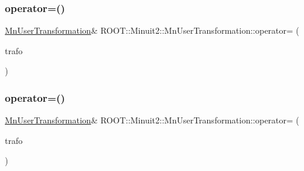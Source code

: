 \subsubsection{\texorpdfstring{operator=()}{operator=()}\hspace{0.1cm}{\footnotesize\ttfamily [1/3]}}
{\footnotesize\ttfamily \mbox{\hyperlink{classROOT_1_1Minuit2_1_1MnUserTransformation}{Mn\+User\+Transformation}}\& R\+O\+O\+T\+::\+Minuit2\+::\+Mn\+User\+Transformation\+::operator= (\begin{DoxyParamCaption}\item[{const \mbox{\hyperlink{classROOT_1_1Minuit2_1_1MnUserTransformation}{Mn\+User\+Transformation}} \&}]{trafo }\end{DoxyParamCaption})\hspace{0.3cm}{\ttfamily [inline]}}

\mbox{\label{classROOT_1_1Minuit2_1_1MnUserTransformation_a54aa66bb6edb8264484b6ece788b903c}} 
\subsubsection{\texorpdfstring{operator=()}{operator=()}\hspace{0.1cm}{\footnotesize\ttfamily [2/3]}}
{\footnotesize\ttfamily \mbox{\hyperlink{classROOT_1_1Minuit2_1_1MnUserTransformation}{Mn\+User\+Transformation}}\& R\+O\+O\+T\+::\+Minuit2\+::\+Mn\+User\+Transformation\+::operator= (\begin{DoxyParamCaption}\item[{const \mbox{\hyperlink{classROOT_1_1Minuit2_1_1MnUserTransformation}{Mn\+User\+Transformation}} \&}]{trafo }\end{DoxyParamCaption})\hspace{0.3cm}{\ttfamily [inline]}}

\mbox{\label{classROOT_1_1Minuit2_1_1MnUserTransformation_a54aa66bb6edb8264484b6ece788b903c}} 
